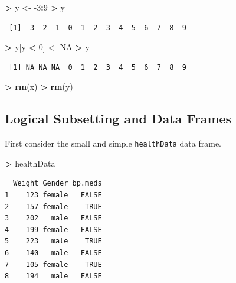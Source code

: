 \documentclass[]{krantz}
\makeatletter
\newenvironment{Shaded}{\begin{snugshade}}{\end{snugshade}}
\newcommand{\DecValTok}[1]{\textcolor[rgb]{0.06,0.06,0.06}{#1}}
\newcommand{\KeywordTok}[1]{\textcolor[rgb]{0.27,0.27,0.27}{\textbf{#1}}}
\newcommand{\NormalTok}[1]{#1}
\newcommand{\OperatorTok}[1]{\textcolor[rgb]{0.43,0.43,0.43}{\textbf{#1}}}
\newcommand{\OtherTok}[1]{\textcolor[rgb]{0.37,0.37,0.37}{#1}}
\newcommand{\StringTok}[1]{\textcolor[rgb]{0.5,0.5,0.5}{#1}}
\newenvironment{kframe}{%
\medskip{}
\setlength{\fboxsep}{.8em}
 \def\at@end@of@kframe{}%
 \ifinner\ifhmode%
  \def\at@end@of@kframe{\end{minipage}}%
  \begin{minipage}{\columnwidth}%
 \fi\fi%
 \def\FrameCommand##1{\hskip\@totalleftmargin \hskip-\fboxsep
 \colorbox{shadecolor}{##1}\hskip-\fboxsep
     \hskip-\linewidth \hskip-\@totalleftmargin \hskip\columnwidth}%
 \MakeFramed {\advance\hsize-\width
   \@totalleftmargin\z@ \linewidth\hsize
   \@setminipage}}%
 {\par\unskip\endMakeFramed%
 \at@end@of@kframe}
\renewenvironment{Shaded}{\begin{kframe}}{\end{kframe}}
\makeatother
\begin{document}
\begin{Shaded}
\begin{Highlighting}[]
\OperatorTok{>}\StringTok{ }\NormalTok{y <-}\StringTok{ }\DecValTok{-3}\OperatorTok{:}\DecValTok{9}
\OperatorTok{>}\StringTok{ }\NormalTok{y}
\end{Highlighting}
\end{Shaded}

\begin{verbatim}
 [1] -3 -2 -1  0  1  2  3  4  5  6  7  8  9
\end{verbatim}

\begin{Shaded}
\begin{Highlighting}[]
\OperatorTok{>}\StringTok{ }\NormalTok{y[y }\OperatorTok{<}\StringTok{ }\DecValTok{0}\NormalTok{] <-}\StringTok{ }\OtherTok{NA}
\OperatorTok{>}\StringTok{ }\NormalTok{y}
\end{Highlighting}
\end{Shaded}

\begin{verbatim}
 [1] NA NA NA  0  1  2  3  4  5  6  7  8  9
\end{verbatim}

\begin{Shaded}
\begin{Highlighting}[]
\OperatorTok{>}\StringTok{ }\KeywordTok{rm}\NormalTok{(x)}
\OperatorTok{>}\StringTok{ }\KeywordTok{rm}\NormalTok{(y)}
\end{Highlighting}
\end{Shaded}

\hypertarget{logical-subsetting-and-data-frames}{%
\subsection{Logical Subsetting and Data Frames}\label{logical-subsetting-and-data-frames}}

First consider the small and simple \texttt{healthData} data frame.

\begin{Shaded}
\begin{Highlighting}[]
\OperatorTok{>}\StringTok{ }\NormalTok{healthData}
\end{Highlighting}
\end{Shaded}

\begin{verbatim}
  Weight Gender bp.meds
1    123 female   FALSE
2    157 female    TRUE
3    202   male   FALSE
4    199 female   FALSE
5    223   male    TRUE
6    140   male   FALSE
7    105 female    TRUE
8    194   male   FALSE
\end{verbatim}
\end{document}
